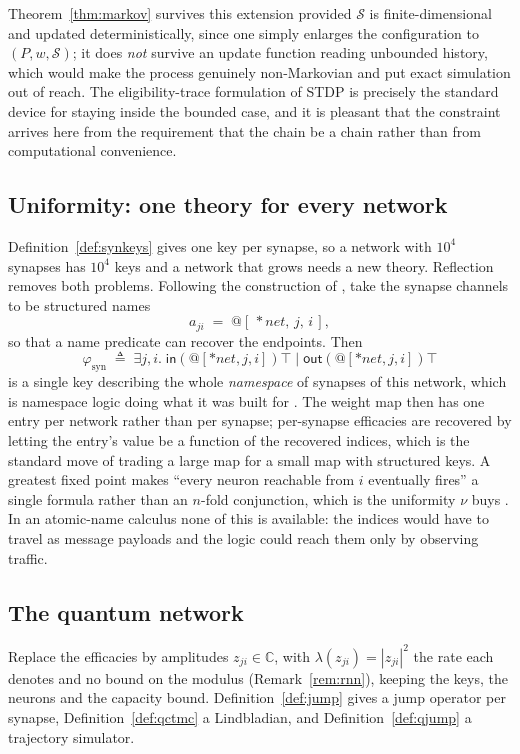 \documentclass[11pt,a4paper]{article}
\theoremstyle{plain}
\theoremstyle{definition}
\theoremstyle{remark}
\newcommand{\sepc}{\mathbin{\big|}}
\newcommand{\out}{\mathsf{out}}
\newcommand{\inn}{\mathsf{in}}
\newcommand{\Cx}{\mathbb{C}}
\newcommand{\wmap}{w}
\begin{document}
Theorem~\ref{thm:markov} survives this extension provided $\mathcal{S}$ is finite-dimensional and
updated deterministically, since one simply enlarges the configuration to
$(P, \wmap, \mathcal{S})$; it does \emph{not} survive an update function reading unbounded history,
which would make the process genuinely non-Markovian and put exact simulation out of reach. The
eligibility-trace formulation of STDP is precisely the standard device for staying inside the
bounded case, and it is pleasant that the constraint arrives here from the requirement that the
chain be a chain rather than from computational convenience.

\subsection{Uniformity: one theory for every network}
\label{sec:rnn-uniform}

Definition~\ref{def:synkeys} gives one key per synapse, so a network with $10^4$ synapses has $10^4$
keys and a network that grows needs a new theory. Reflection removes both problems. Following the
construction of \cite{knots}, take the synapse channels to be structured names
\[
a_{ji} \;=\; @[\,*\mathit{net},\, j,\, i\,],
\]
so that a name predicate can recover the endpoints. Then
\[
\varphi_{\mathrm{syn}} \;\triangleq\; \exists j, i.\; \inn(@[*\mathit{net},j,i])\top \;\sepc\; \out(@[*\mathit{net},j,i])\top
\]
is a single key describing the whole \emph{namespace} of synapses of this network, which is
namespace logic doing what it was built for \cite{namespace}. The weight map then has one entry per
network rather than per synapse; per-synapse efficacies are recovered by letting the entry's value be
a function of the recovered indices, which is the standard move of trading a large map for a small
map with structured keys. A greatest fixed point makes ``every neuron reachable from $i$ eventually
fires'' a single formula rather than an $n$-fold conjunction, which is the uniformity $\nu$ buys
\cite[\S3]{classifier}. In an atomic-name calculus none of this is available: the indices would have
to travel as message payloads and the logic could reach them only by observing traffic.

\subsection{The quantum network}
\label{sec:rnn-quantum}

Replace the efficacies by amplitudes $z_{ji} \in \Cx$, with $\lambda(z_{ji}) = |z_{ji}|^2$ the rate
each denotes and no bound on the modulus (Remark~\ref{rem:rnn}), keeping the keys, the neurons and
the capacity bound. Definition~\ref{def:jump} gives a jump operator per synapse,
Definition~\ref{def:qctmc} a Lindbladian, and Definition~\ref{def:qjump} a trajectory simulator.
\end{document}
